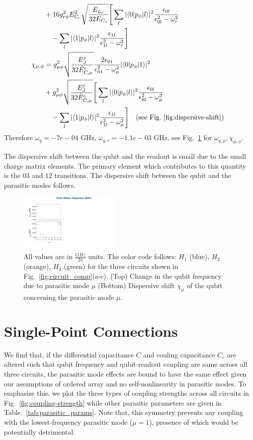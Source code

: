 \documentclass[%
reprint,
superscriptaddress,
 amsmath,amssymb,
 aps,
 prx,
longbibliography,
floatfix,
]{revtex4-2}
\begin{document}
{\begin{align}
   &+16g_{r\phi}^2E_{C_r}^2\sqrt{\frac{E_{L_r}}{32E_{C_r}}}\Bigg[\sum_l|\langle 0|p_\phi|l \rangle|^2\frac{\epsilon_{0l}}{\epsilon_{0l}^2-\omega_r^2}\nonumber\\&\quad-\sum_l|\langle 1|p_\phi|l \rangle|^2\frac{\epsilon_{1l}}{\epsilon_{1l}^2-\omega_r^2}\Bigg] \\
   \chi_{\mu,\phi}&=g_{\mu\phi}^2\sqrt{\frac{E_J^j}{32\tilde{E}_{C,\mu}^e}}\frac{2\epsilon_{01}}{\epsilon_{01}^2-\omega_\mu^2}|\langle 0|p_\phi|1 \rangle|^2\nonumber\\
   &+g_{\mu\phi}^2\sqrt{\frac{E_J^j}{32\tilde{E}_{C,\mu}^e}}\Bigg[\sum_l|\langle 0|p_\phi|l \rangle|^2\frac{\epsilon_{0l}}{\epsilon_{0l}^2-\omega_\mu^2}\nonumber\\&\quad-\sum_l|\langle 1|p_\phi|l \rangle|^2\frac{\epsilon_{1l}}{\epsilon_{1l}^2-\omega_\mu^2}\Bigg]
   \quad\text{(see Fig.~\ref{fig:dispersive-shift})}
\end{align}
}
Therefore $\omega_q=-7e-04$ GHz, $\omega_{q,r}=-1.1e-03$ GHz, see Fig.~\ref{fig:dispersive-shift} for $\omega_{q,\mu},\chi_{\mu,\phi}$.
   
The dispersive shift between the qubit and the readout is small due to the small charge matrix elements. The primary element which contributes to this quantity is the $03$ and $12$ transitions. The dispersive shift between the qubit and the parasitic modes follows.
\begin{figure}[htb]
    \centering
    \includegraphics[width=0.45\textwidth]{Figures/dispersive-shift.pdf}
    \caption{All values are in $\frac{GHz}{2\pi}$ units. The color code follows: $H_1$ (blue), $H_2$ (orange), $H_3$ (green) for the three circuits shown in Fig.~\ref{fig:circuit_comp}(a-c). (Top) Change in the qubit frequency due to parasitic mode $\mu$ (Bottom) Dispersive shift $\chi_\mu$ of the qubit concerning the parasitic mode $\mu$.}
    \label{fig:dispersive-shift}
\end{figure}
\section{Single-Point Connections}\label{app:alt_circuits}
We find that, if the differential capacitance $C$ and couling capacitance $C_c$ are altered such that qubit frequency and qubit-readout coupling are same across all three circuits, the parasitic mode effects are bound to have the same effect given our assumptions of ordered array and no self-nonlinearity in parasitic modes. To emphasize this, we plot the three types of coupling strengths across all circuits in Fig.~\ref{fig:coupling-strength} while other parasitic parameters are given in Table.~\ref{tab:parasitic_params}. Note that, this symmetry prevents any coupling with the lowest-frequency parasitic mode ($\mu=1$), presence of which would be potentially detrimental. 
\end{document}
